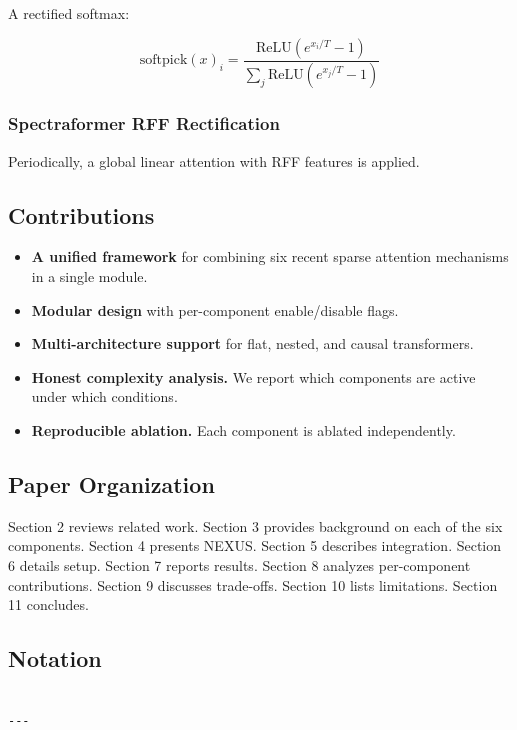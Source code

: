 A rectified softmax:

\[
\text{softpick}(x)_i = \frac{\text{ReLU}(e^{x_i/T} - 1)}{\sum_j \text{ReLU}(e^{x_j/T} - 1)}
\tag{1.4}
\]

\subsubsection{Spectraformer RFF Rectification}

Periodically, a global linear attention with RFF features is applied.

\subsection{Contributions}

\begin{itemize}
\item \textbf{A unified framework} for combining six recent sparse attention
  mechanisms in a single module.
\item \textbf{Modular design} with per-component enable/disable flags.
\item \textbf{Multi-architecture support} for flat, nested, and causal transformers.
\item \textbf{Honest complexity analysis.} We report which components are active under
  which conditions.
\item \textbf{Reproducible ablation.} Each component is ablated independently.

\end{itemize}
\subsection{Paper Organization}

Section 2 reviews related work. Section 3 provides background on each of 
the six components. Section 4 presents NEXUS. Section 5 describes 
integration. Section 6 details setup. Section 7 reports results. Section 8 
analyzes per-component contributions. Section 9 discusses trade-offs. 
Section 10 lists limitations. Section 11 concludes.



\subsection{Notation}

\begin{lstlisting}

---
\end{lstlisting}